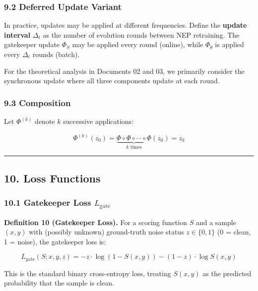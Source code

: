 \documentclass[
  12pt,
]{article}
\begin{document}
\subsubsection{9.2 Deferred Update
Variant}\label{deferred-update-variant}

In practice, updates may be applied at different frequencies. Define the
\textbf{update interval} \(\Delta_t\) as the number of evolution rounds
between NEP retraining. The gatekeeper update \(\Phi_S\) may be applied
every round (online), while \(\Phi_\theta\) is applied every
\(\Delta_t\) rounds (batch).

For the theoretical analysis in Documents 02 and 03, we primarily
consider the synchronous update where all three components update at
each round.

\subsubsection{9.3 Composition}\label{composition}

Let \(\Phi^{(k)}\) denote \(k\) successive applications:

\[\Phi^{(k)}(z_0) = \underbrace{\Phi \circ \Phi \circ \cdots \circ \Phi}_{k \text{ times}}(z_0) = z_k\]

\begin{center}\rule{0.5\linewidth}{0.5pt}\end{center}

\subsection{10. Loss Functions}\label{loss-functions}

\subsubsection{\texorpdfstring{10.1 Gatekeeper Loss
\(L_{\text{gate}}\)}{10.1 Gatekeeper Loss L\_\{\textbackslash text\{gate\}\}}}\label{gatekeeper-loss-l_textgate}

\textbf{Definition 10 (Gatekeeper Loss).} For a scoring function \(S\)
and a sample \((x, y)\) with (possibly unknown) ground-truth noise
status \(z \in \{0,1\}\) (0 = clean, 1 = noise), the gatekeeper loss is:

\[L_{\text{gate}}(S; x, y, z) = -z \cdot \log(1 - S(x,y)) - (1-z) \cdot \log S(x,y)\]

This is the standard binary cross-entropy loss, treating \(S(x,y)\) as
the predicted probability that the sample is clean.
\end{document}
